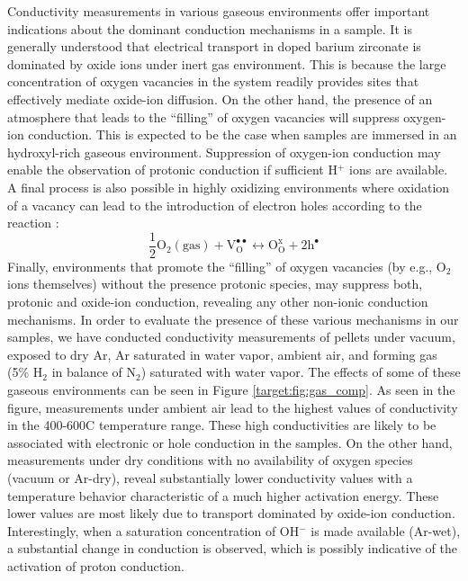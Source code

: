 Conductivity measurements in various gaseous environments offer important indications about the dominant conduction mechanisms in a sample. It is generally understood that electrical transport in doped barium zirconate is dominated by oxide ions under inert gas environment. This is because the large concentration of oxygen vacancies in the system readily provides sites that effectively mediate oxide-ion diffusion. On the other hand, the presence of an atmosphere that leads to the ``filling'' of oxygen vacancies will suppress oxygen-ion conduction. This is expected to be the case when samples are immersed in an hydroxyl-rich gaseous environment. Suppression of oxygen-ion conduction may enable the observation of protonic conduction if sufficient H$^+$ ions are available. A final process is also possible in highly oxidizing environments where oxidation of a vacancy can lead to the introduction of electron holes according to the reaction \cite{Yamazaki2008}:
\begin{equation}
    \mathrm{\frac{1}{2}O_2(gas) + V_O^{\bullet\bullet}  \leftrightarrow O_O^x + 2 h^{\bullet}}
    \label{eq:bulk:holeConduction}
\end{equation}
Finally, environments that promote the ``filling'' of  oxygen vacancies (by e.g., O$_2$ ions themselves) without the presence protonic species, may suppress both, protonic and oxide-ion conduction, revealing any other non-ionic conduction mechanisms. In order to evaluate the presence of these various mechanisms in our samples, we have conducted conductivity measurements of pellets under vacuum, exposed to dry Ar, Ar saturated in water vapor, ambient air, and forming gas (5\% H$_2$ in balance of N$_2$) saturated with water vapor.  The effects of some of these gaseous environments can be seen in Figure \ref{target:fig:gas_comp}. As seen in the figure, measurements under ambient air lead to the highest values of conductivity in the 400-600\textdegree C temperature range. These high conductivities are likely to be associated with electronic or hole conduction in the samples. On the other hand, measurements under dry conditions with no availability of oxygen species (vacuum or Ar-dry), reveal substantially lower conductivity values with a temperature behavior characteristic of a much higher activation energy. These lower values are most likely due to transport dominated by oxide-ion conduction. Interestingly, when a saturation concentration of OH$^-$ is made available (Ar-wet), a substantial change in conduction is observed, which is possibly indicative of the activation of proton conduction. 


